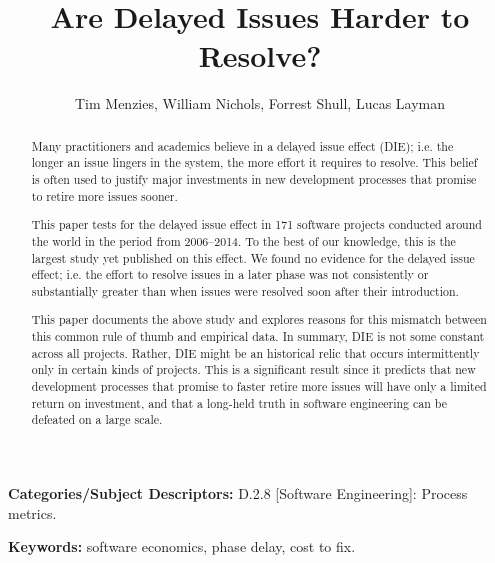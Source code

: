 \documentclass[smallcondensed]{svjour3}
\begin{document}
\date{}
 \title{Are Delayed Issues Harder to Resolve?}
 
 \author{Tim Menzies, William Nichols, Forrest Shull, Lucas Layman}
 
\maketitle
\begin{abstract}
Many  practitioners and academics
believe in a delayed issue effect (DIE); i.e.
 the longer an issue lingers in the system, the more effort it requires to resolve.
This belief
is often  used to justify 
major investments in  new development
processes that promise to retire more issues sooner.

This paper tests for the delayed issue effect in
171 software projects conducted around the world in the period from 2006--2014.
To the best of our knowledge,  this is the largest study
yet published on this effect.
We found no evidence for the  delayed issue effect; i.e.
the  effort  to resolve 
issues in a later phase was not consistently or substantially greater than  
when  issues were resolved soon after their introduction. 

This paper documents the above study and explores reasons for this  mismatch between this common rule of thumb and empirical data.
In  summary, DIE is not some constant across all projects. Rather, DIE might
be an historical relic that  occurs intermittently 
only in  certain kinds of projects.  This is a significant result since it predicts that  new development
processes that promise to faster retire more issues will have only a  limited return on investment, and that a long-held truth in software engineering can be defeated on a large scale. 
\end{abstract}

 \vspace{1mm}
\noindent
{\bf Categories/Subject Descriptors:} 
D.2.8 [Software Engineering]: Process metrics.

 

\vspace{1mm}
\noindent
{\bf Keywords:} software economics, phase delay, cost to fix.
  
\end{document}
